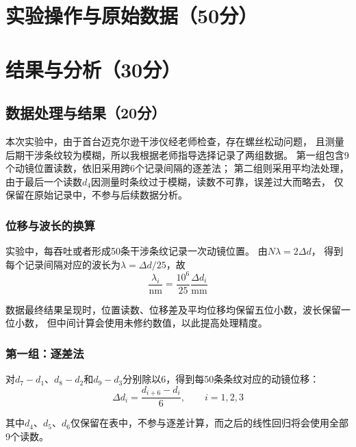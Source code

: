 \documentclass[10pt,a4paper]{ctexart} %
\begin{document}
\section{实验操作与原始数据（50分）}

\section{结果与分析（30分）}

  \subsection{数据处理与结果（20分）}
  本次实验中，由于首台迈克尔逊干涉仪经老师检查，存在螺丝松动问题，
  且测量后期干涉条纹较为模糊，所以我根据老师指导选择记录了两组数据。
  第一组包含9个动镜位置读数，依旧采用跨6个记录间隔的逐差法；
  第二组则采用平均法处理，由于最后一个读数$d_4$因测量时条纹过于模糊，读数不可靠，误差过大而略去，
  仅保留在原始记录中，不参与后续数据分析。

  \subsubsection{位移与波长的换算}
  实验中，每吞吐或者形成50条干涉条纹记录一次动镜位置。
  由$N\lambda=2\Delta d$，
  得到每个记录间隔对应的波长为$\lambda=\Delta d/25$，故
  \[
    \frac{\lambda_i}{\mathrm{nm}}
    =\frac{10^6}{25}\frac{\Delta d_i}{\mathrm{mm}}
  \]

  数据最终结果呈现时，位置读数、位移差及平均位移均保留五位小数，波长保留一位小数，
  但中间计算会使用未修约数值，以此提高处理精度。

  \subsubsection{第一组：逐差法}
  对$d_7-d_1$、$d_8-d_2$和$d_9-d_3$分别除以6，得到每50条条纹对应的动镜位移：
  \[
    \Delta d_i=\frac{d_{i+6}-d_i}{6},\qquad i=1,2,3
  \]
  
  其中$d_4$、$d_5$、$d_6$仅保留在表中，不参与逐差计算，而之后的线性回归将会使用全部9个读数。
\end{document}
